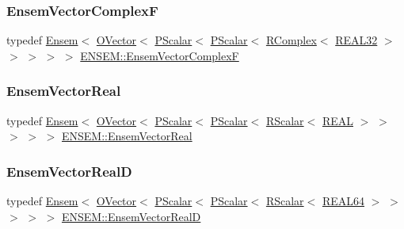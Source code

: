 \mbox{\label{group__defs_ga1e5f825ea470aefb26cfc8ac86b07aff}} 
\subsubsection{\texorpdfstring{EnsemVectorComplexF}{EnsemVectorComplexF}}
{\footnotesize\ttfamily typedef \mbox{\hyperlink{classENSEM_1_1Ensem}{Ensem}}$<$ \mbox{\hyperlink{classENSEM_1_1OVector}{O\+Vector}}$<$ \mbox{\hyperlink{classENSEM_1_1PScalar}{P\+Scalar}}$<$ \mbox{\hyperlink{classENSEM_1_1PScalar}{P\+Scalar}}$<$ \mbox{\hyperlink{classENSEM_1_1RComplex}{R\+Complex}}$<$ \mbox{\hyperlink{namespaceENSEM_a7540d01191172323e9073283d772576d}{R\+E\+A\+L32}} $>$ $>$ $>$ $>$ $>$ \mbox{\hyperlink{group__defs_ga1e5f825ea470aefb26cfc8ac86b07aff}{E\+N\+S\+E\+M\+::\+Ensem\+Vector\+ComplexF}}}

\mbox{\label{group__defs_gaa5c6b9de066b629db579dd1b6a585299}} 
\subsubsection{\texorpdfstring{EnsemVectorReal}{EnsemVectorReal}}
{\footnotesize\ttfamily typedef \mbox{\hyperlink{classENSEM_1_1Ensem}{Ensem}}$<$ \mbox{\hyperlink{classENSEM_1_1OVector}{O\+Vector}}$<$ \mbox{\hyperlink{classENSEM_1_1PScalar}{P\+Scalar}}$<$ \mbox{\hyperlink{classENSEM_1_1PScalar}{P\+Scalar}}$<$ \mbox{\hyperlink{classENSEM_1_1RScalar}{R\+Scalar}}$<$ \mbox{\hyperlink{namespaceENSEM_a6dd9aa6508168f545c861787e63ddd1e}{R\+E\+AL}} $>$ $>$ $>$ $>$ $>$ \mbox{\hyperlink{group__defs_gaa5c6b9de066b629db579dd1b6a585299}{E\+N\+S\+E\+M\+::\+Ensem\+Vector\+Real}}}

\mbox{\label{group__defs_ga7e294215cc7d7c343921ba1aef53d4dd}} 
\subsubsection{\texorpdfstring{EnsemVectorRealD}{EnsemVectorRealD}}
{\footnotesize\ttfamily typedef \mbox{\hyperlink{classENSEM_1_1Ensem}{Ensem}}$<$ \mbox{\hyperlink{classENSEM_1_1OVector}{O\+Vector}}$<$ \mbox{\hyperlink{classENSEM_1_1PScalar}{P\+Scalar}}$<$ \mbox{\hyperlink{classENSEM_1_1PScalar}{P\+Scalar}}$<$ \mbox{\hyperlink{classENSEM_1_1RScalar}{R\+Scalar}}$<$ \mbox{\hyperlink{namespaceENSEM_a85b215b9f1f43715aebee01718e25082}{R\+E\+A\+L64}} $>$ $>$ $>$ $>$ $>$ \mbox{\hyperlink{group__defs_ga7e294215cc7d7c343921ba1aef53d4dd}{E\+N\+S\+E\+M\+::\+Ensem\+Vector\+RealD}}}

